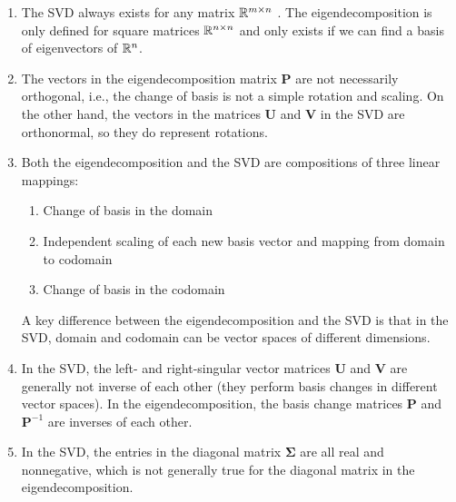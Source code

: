 \begin{enumerate}
    \item The SVD always exists for any matrix $\mathbb{R}^{m\times n}$ . 
    The eigendecomposition is only defined for square matrices $\mathbb{R}^{n\times n}$ and only exists if we can find a basis of eigenvectors of $\mathbb{R}^n$.
    \hfill \cite{mfml/book/mml/Deisenroth-Faisal-Ong}

    \item The vectors in the eigendecomposition matrix $\bm{P}$ are not necessarily orthogonal, i.e., the change of basis is not a simple rotation and scaling. 
    On the other hand, the vectors in the matrices $\bm{U}$ and $\bm{V}$ in the SVD are orthonormal, so they do represent rotations.
    \hfill \cite{mfml/book/mml/Deisenroth-Faisal-Ong}

    \item Both the eigendecomposition and the SVD are compositions of three linear mappings:
    \hfill \cite{mfml/book/mml/Deisenroth-Faisal-Ong}
    \begin{enumerate}
        \item Change of basis in the domain
        \hfill \cite{mfml/book/mml/Deisenroth-Faisal-Ong}

        \item Independent scaling of each new basis vector and mapping from domain to codomain
        \hfill \cite{mfml/book/mml/Deisenroth-Faisal-Ong}

        \item Change of basis in the codomain
        \hfill \cite{mfml/book/mml/Deisenroth-Faisal-Ong}
    \end{enumerate}
    A key difference between the eigendecomposition and the SVD is that in the SVD, domain and codomain can be vector spaces of different dimensions.
    \hfill \cite{mfml/book/mml/Deisenroth-Faisal-Ong}

    \item In the SVD, the left- and right-singular vector matrices $\bm{U}$ and $\bm{V}$ are generally not inverse of each other (they perform basis changes in different vector spaces). 
    In the eigendecomposition, the basis change matrices $\bm{P}$ and $\bm{P}^{ -1}$ are inverses of each other.
    \hfill \cite{mfml/book/mml/Deisenroth-Faisal-Ong}

    \item In the SVD, the entries in the diagonal matrix $\bm{\Sigma}$ are all real and nonnegative, which is not generally true for the diagonal matrix in the eigendecomposition.
    \hfill \cite{mfml/book/mml/Deisenroth-Faisal-Ong}


\end{enumerate}
